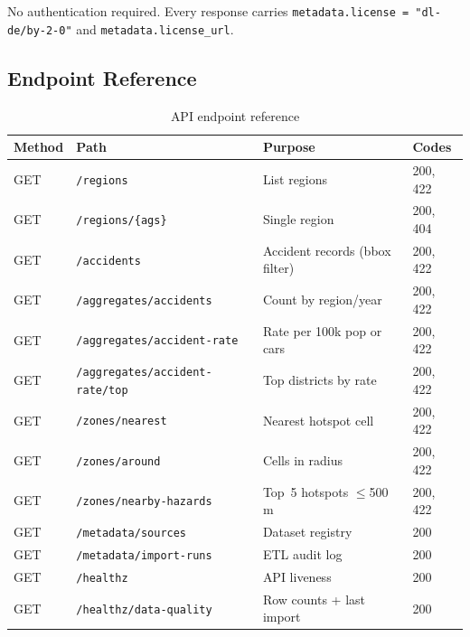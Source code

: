 \documentclass[12pt,a4paper]{article}
\begin{document}
No authentication required. Every response carries \texttt{metadata.license = "dl-de/by-2-0"} and \texttt{metadata.license\_url}.

\subsection*{Endpoint Reference}

\begin{table}[H]
\centering
\caption{API endpoint reference}
\label{tab:endpoints}
\begin{tabularx}{\textwidth}{llXl}
\toprule
\textbf{Method} & \textbf{Path} & \textbf{Purpose} & \textbf{Codes} \\
\midrule
GET & \texttt{/regions}                       & List regions                    & 200, 422 \\
GET & \texttt{/regions/\{ags\}}               & Single region                   & 200, 404 \\
GET & \texttt{/accidents}                     & Accident records (bbox filter)  & 200, 422 \\
GET & \texttt{/aggregates/accidents}          & Count by region/year            & 200, 422 \\
GET & \texttt{/aggregates/accident-rate}      & Rate per 100k pop or cars       & 200, 422 \\
GET & \texttt{/aggregates/accident-rate/top}  & Top districts by rate           & 200, 422 \\
GET & \texttt{/zones/nearest}                 & Nearest hotspot cell            & 200, 422 \\
GET & \texttt{/zones/around}                  & Cells in radius                 & 200, 422 \\
GET & \texttt{/zones/nearby-hazards}          & Top~5 hotspots $\leq$500\,m    & 200, 422 \\
GET & \texttt{/metadata/sources}              & Dataset registry                & 200      \\
GET & \texttt{/metadata/import-runs}          & ETL audit log                   & 200      \\
GET & \texttt{/healthz}                       & API liveness                    & 200      \\
GET & \texttt{/healthz/data-quality}          & Row counts + last import        & 200      \\
\bottomrule
\end{tabularx}
\end{table}
\end{document}

